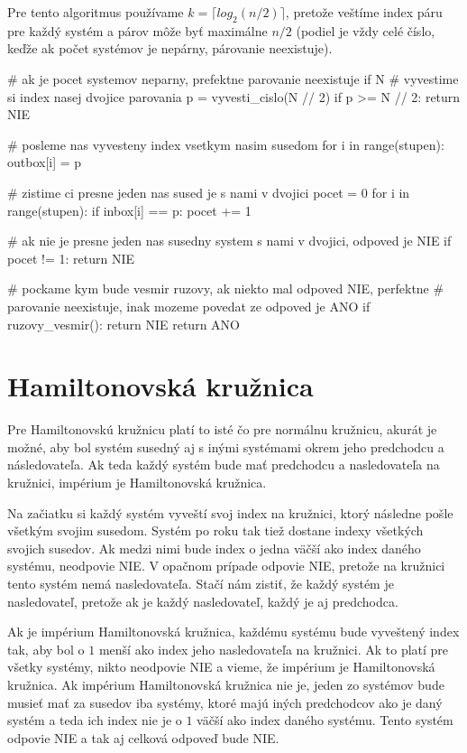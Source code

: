 \documentclass[10pt]{article}
\begin{document}
Pre tento algoritmus používame $k=\lceil log_2 (n / 2) \rceil$, pretože veštíme
index páru pre každý systém a párov môže byť maximálne $n/2$ (podiel je vždy
celé číslo, keďže ak počet systémov je nepárny, párovanie neexistuje).

\begin{python}
# ak je pocet systemov neparny, prefektne parovanie neexistuje
if N %
# vyvestime si index nasej dvojice parovania
p = vyvesti_cislo(N // 2)
if p >= N // 2: return NIE

# posleme nas vyvesteny index vsetkym nasim susedom
for i in range(stupen):
    outbox[i] = p

# zistime ci presne jeden nas sused je s nami v dvojici
pocet = 0
for i in range(stupen):
    if inbox[i] == p:
        pocet += 1

# ak nie je presne jeden nas susedny system s nami v dvojici, odpoved je NIE
if pocet != 1: return NIE

# pockame kym bude vesmir ruzovy, ak niekto mal odpoved NIE, perfektne
# parovanie neexistuje, inak mozeme povedat ze odpoved je ANO
if ruzovy_vesmir(): return NIE
return ANO
\end{python}

\section*{Hamiltonovská kružnica}

Pre Hamiltonovskú kružnicu platí to isté čo pre normálnu kružnicu, akurát je
možné, aby bol systém susedný aj s inými systémami okrem jeho predchodcu a 
následovateľa. Ak teda každý systém bude mať predchodcu a nasledovateľa na
kružnici, impérium je Hamiltonovská kružnica.

Na začiatku si každý systém vyveští svoj index na kružnici, ktorý následne
pošle všetkým svojim susedom. Systém po roku tak tiež dostane indexy všetkých 
svojich susedov. Ak medzi nimi bude index o jedna väčší ako index daného
systému, neodpovie NIE. V opačnom prípade odpovie NIE, pretože na kružnici
tento systém nemá nasledovateľa. Stačí nám zistiť, že každý systém je
nasledovateľ, pretože ak je každý nasledovateľ, každý je aj predchodca.

Ak je impérium Hamiltonovská kružnica, každému systému bude vyveštený index
tak, aby bol o $1$ menší ako index jeho nasledovateľa na kružnici. Ak to platí
pre všetky systémy, nikto neodpovie NIE a vieme, že impérium je Hamiltonovská
kružnica. Ak impérium Hamiltonovská kružnica nie je, jeden zo systémov bude
musieť mať za susedov iba systémy, ktoré majú iných predchodcov ako je daný
systém a teda ich index nie je o $1$ väčší ako index daného systému. Tento
systém odpovie NIE a tak aj celková odpoveď bude NIE.
\end{document}
